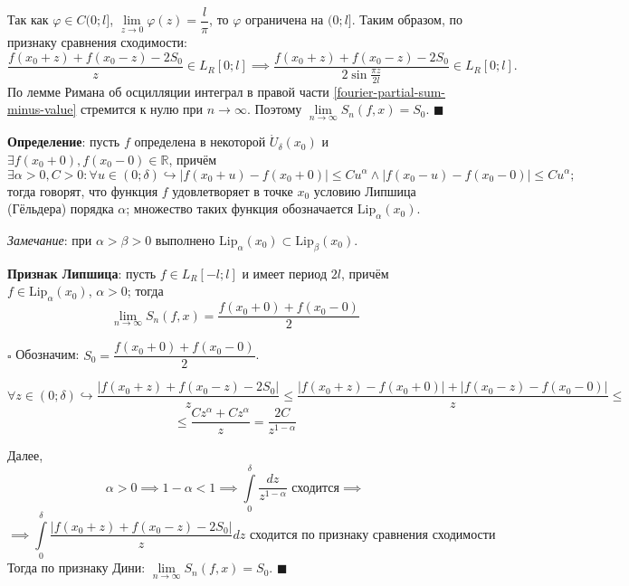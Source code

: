 \documentclass[12pt, a4paper, reqno]{article}
\begin{document}
    Так как $\varphi \in C(0; l]$, $\lim\limits_{z \to 0} \varphi(z) = \dfrac{l}{\pi}$, то $\varphi$
    ограничена на $(0; l]$. Таким образом, по признаку сравнения сходимости:
    \begin{equation*}
        \frac{f(x_0 + z) + f(x_0 - z) - 2S_0}{z} \in L_R[0; l] \implies
        \frac{f(x_0 + z) + f(x_0 - z) - 2S_0}{2\sin{\frac{\pi z}{2l}}} \in L_R[0; l].
    \end{equation*}
    По лемме Римана об осцилляции интеграл в правой части \eqref{fourier-partial-sum-minus-value}
    стремится к нулю при $n \to \infty$. Поэтому $\lim\limits_{n \to \infty} S_n(f, x) = S_0$.
    $\blacksquare$

    \textbf{Определение}: пусть $f$ определена в некоторой $\mathring U_{\delta}(x_0)$ и
    $\exists f(x_0 + 0), f(x_0 - 0) \in \mathbb{R}$, причём
    \begin{equation*}
        \exists \alpha > 0, C > 0: \forall u \in (0; \delta) \hookrightarrow
        |f(x_0 + u) - f(x_0 + 0)| \leq C u^{\alpha} \wedge
        |f(x_0 - u) - f(x_0 - 0)| \leq C u^{\alpha};
    \end{equation*}
    тогда говорят, что функция $f$ удовлетворяет в точке $x_0$ условию Липшица (Гёльдера) порядка
    $\alpha$; множество таких функция обозначается $\text{Lip}_{\alpha}(x_0)$.

    \textit{Замечание}: при $\alpha > \beta > 0$ выполнено
    $\text{Lip}_{\alpha}(x_0) \subset \text{Lip}_{\beta}(x_0)$.

    \textbf{Признак Липшица}: пусть $f \in L_R[-l; l]$ и имеет период $2l$, причём
    $f \in \text{Lip}_{\alpha}(x_0)$, $\alpha > 0$; тогда
    \begin{equation*}
        \lim\limits_{n \to \infty} S_n(f, x) = \frac{f(x_0 + 0) + f(x_0 - 0)}{2}
    \end{equation*}

    $\square$
    Обозначим: $S_0 = \dfrac{f(x_0 + 0) + f(x_0 - 0)}{2}$.

    \begin{equation*}
        \forall z \in (0; \delta) \hookrightarrow
        \frac{|f(x_0 + z) + f(x_0 - z) - 2S_0|}{z} \leq
        \frac{|f(x_0 + z) - f(x_0 + 0)| + |f(x_0 - z) - f(x_0 - 0)|}{z} \leq
    \end{equation*}
    \begin{equation*}
        \leq \frac{C z^{\alpha} + C z^{\alpha}}{z} = \frac{2C}{z^{1 - \alpha}}
    \end{equation*}

    Далее,
    \begin{equation*}
        \alpha > 0 \implies 1 - \alpha < 1 \implies
        \int\limits_{0}^{\delta} \frac{dz}{z^{1 - \alpha}}\text{ сходится} \implies
    \end{equation*}
    \begin{equation*}
        \implies \int\limits_{0}^{\delta} \frac{|f(x_0 + z) + f(x_0 - z) - 2S_0|}{z}dz
        \text{ сходится по признаку сравнения сходимости}
    \end{equation*}
    Тогда по признаку Дини: $\lim\limits_{n \to \infty} S_n(f, x) = S_0$.
    $\blacksquare$
\end{document}
